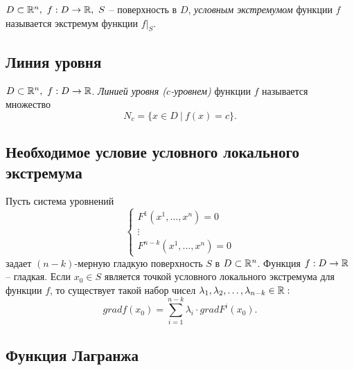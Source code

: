 \begin{definition}
    $ D \subset \R^n, \ f:D\rightarrow\R, \ S $ -- поверхность в $D$, \emph{условным экстремумом} функции $f$ называется экстремум функции $f\big|_S$.
\end{definition}

\subsection{Линия уровня}

\begin{definition}
    $D \subset \R^n, \ f:D\rightarrow\R$. \emph{Линией уровня ($c$-уровнем)} функции $f$ называется множество
    \[
        N_c = \big\{x\in D \ \big| \ f(x) = c\big\}.
    \]
\end{definition}

\subsection{Необходимое условие условного локального экстремума}

\begin{theorem}
    Пусть система уровнений
    \begin{equation}\label{eq:20}
        \left\{\begin{array}{l}
            F^1(x^1,\ldots,x^n) = 0 \\
            \vdots                  \\
            F^{n-k}(x^1,\ldots,x^n) = 0
        \end{array}\right.
    \end{equation}
    задает $(n-k)$-мерную гладкую поверхность $S$ в $D \subset \mathbb{R}^n $. Функция $f:D\rightarrow\mathbb{R}$ -- гладкая. Если $x_0 \in S$ является точкой условного локального экстремума для функции $f$, то существует такой набор чисел $\lambda_1,\lambda_2,\ldots,\lambda_{n-k} \in \mathbb{R}:$
    \[
        grad f(x_0) = \sum_{i = 1}^{n-k}\lambda_i \cdot grad F^i(x_0).
    \]
\end{theorem}

\newpage

\subsection{Функция Лагранжа}

